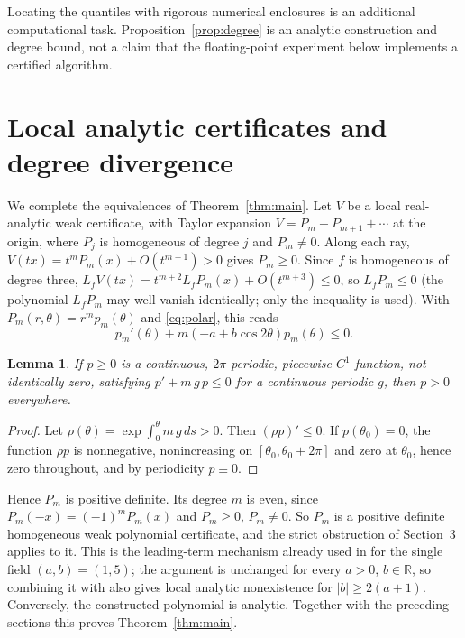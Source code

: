 \documentclass[11pt]{article}
\newtheorem{lemma}[theorem]{Lemma}
\theoremstyle{remark}\newtheorem{remark}[theorem]{Remark}
\newcommand{\R}{\mathbb R}
\begin{document}
Locating the quantiles with rigorous numerical enclosures is an
additional computational task. Proposition~\ref{prop:degree} is an
analytic construction and degree bound, not a claim that the
floating-point experiment below implements a certified algorithm.

\section{Local analytic certificates and degree divergence}\label{sec:local}
We complete the equivalences of Theorem~\ref{thm:main}.
Let \(V\) be a local real-analytic weak certificate, with Taylor
expansion \(V=P_m+P_{m+1}+\cdots\) at the origin, where \(P_j\) is
homogeneous of degree \(j\) and \(P_m\ne0\).
Along each ray, \(V(tx)=t^mP_m(x)+O(t^{m+1})>0\) gives \(P_m\ge0\).
Since \(f\) is homogeneous of degree three,
\(L_fV(tx)=t^{m+2}L_fP_m(x)+O(t^{m+3})\le0\), so \(L_fP_m\le0\)
(the polynomial \(L_fP_m\) may well vanish identically; only the
inequality is used). With \(P_m(r,\theta)=r^mp_m(\theta)\) and
\eqref{eq:polar}, this reads
\begin{equation}\label{eq:leading}
 p_m'(\theta)+m(-a+b\cos2\theta)p_m(\theta)\le0.
\end{equation}
\begin{lemma}\label{lem:intfactor}
If \(p\ge0\) is a continuous, \(2\pi\)-periodic, piecewise \(C^1\)
function, not identically zero, satisfying
\(p'+m\,g\,p\le0\) for a continuous periodic \(g\), then \(p>0\)
everywhere.
\end{lemma}
\begin{proof}
Let \(\rho(\theta)=\exp\int_0^\theta m\,g\,ds>0\). Then
\((\rho p)'\le0\). If \(p(\theta_0)=0\), the function \(\rho p\) is
nonnegative, nonincreasing on \([\theta_0,\theta_0+2\pi]\) and zero at
\(\theta_0\), hence zero throughout, and by periodicity \(p\equiv0\).
\end{proof}
Hence \(P_m\) is positive definite. Its degree \(m\) is even, since
\(P_m(-x)=(-1)^mP_m(x)\) and \(P_m\ge0\), \(P_m\ne0\). So \(P_m\) is a
positive definite homogeneous weak polynomial certificate, and the strict
obstruction of Section~3 applies to it. This is the leading-term
mechanism already used in \cite[Sec.~III-D]{liu} for the single field
\((a,b)=(1,5)\); the argument is unchanged for every \(a>0\), \(b\in\R\),
so combining it with \cite[Theorem IV.3]{liu} also gives local analytic
nonexistence for \(|b|\ge2(a+1)\).
Conversely, the constructed polynomial is analytic.
Together with the preceding sections this proves
Theorem~\ref{thm:main}.
\end{document}
